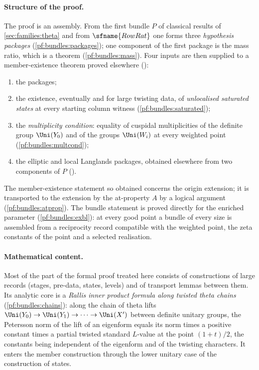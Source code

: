 \paragraph{Structure of the proof.}
The proof is an assembly. From the first bundle $P$ of classical results of \cref{sec:families:theta} and from
$\sfname{RowRat}$ one forms three \emph{hypothesis packages} (\cref{pf:bundles:packages}); one component of the first
package is the mass ratio, which is a theorem (\cref{pf:bundles:mass}). Four inputs are then supplied to a member-existence
theorem proved elsewhere ():
\begin{enumerate}[label=(\roman*)]
\item the packages;
\item the existence, eventually and for large twisting data, of \emph{unlocalised saturated states} at every starting
column witness (\cref{pf:bundles:saturated});
\item the \emph{multiplicity condition}: equality of cuspidal multiplicities of the definite group $\Uni(Y_0)$ and of the
groups $\Uni(W_i)$ at every weighted point (\cref{pf:bundles:multcond});
\item the elliptic and local Langlands packages, obtained elsewhere from two components of $P$
().
\end{enumerate}
The member-existence statement so obtained concerns the origin extension; it is transported to the extension by the
at-property $A$ by a logical argument (\cref{pf:bundles:atprop}). The bundle statement is proved directly for the enriched
parameter (\cref{pf:bundles:exbl}): at every good point a bundle of every size is assembled from a reciprocity record
compatible with the weighted point, the zeta constants of the point and a selected realisation.

\paragraph{Mathematical content.}
Most of the part of the formal proof treated here consists of constructions of large records (stages, pre-data, states,
levels) and of transport lemmas between them. Its analytic core is a \emph{Rallis inner product formula along twisted
theta chains} (\cref{pf:bundles:chains}): along the chain of theta lifts $\Uni(Y_0)\to\Uni(Y_1)\to\dots\to\Uni(X')$ between
definite unitary groups, the Petersson norm of the lift of an eigenform equals its norm times a positive constant times a
partial twisted standard $L$-value at the point $(1+t)/2$, the constants being independent of the eigenform and of the
twisting characters. It enters the member construction through the lower unitary case of the construction of states.


